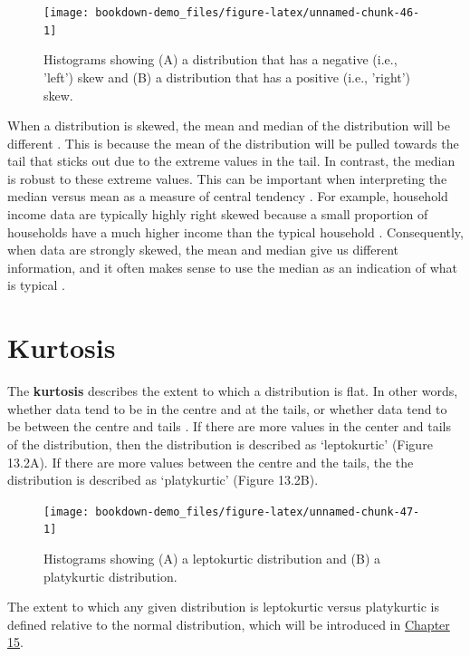 \documentclass[
]{scrbook}
\begin{document}
\begin{figure}
\texttt{[image: bookdown-demo\_files/figure-latex/unnamed-chunk-46-1]} \caption{Histograms showing (A) a distribution that has a negative (i.e., 'left') skew and (B) a distribution that has a positive (i.e., 'right') skew.}\label{fig:unnamed-chunk-46}
\end{figure}

When a distribution is skewed, the mean and median of the distribution will be different \citep{Sokal1995}.
This is because the mean of the distribution will be pulled towards the tail that sticks out due to the extreme values in the tail.
In contrast, the median is robust to these extreme values.
This can be important when interpreting the median versus mean as a measure of central tendency \citep{Reichmann1970}.
For example, household income data are typically highly right skewed because a small proportion of households have a much higher income than the typical household \citep{Mcdonald2013}.
Consequently, when data are strongly skewed, the mean and median give us different information, and it often makes sense to use the median as an indication of what is typical \citep{Chiripanhura2011}.

\hypertarget{kurtosis}{%
\section{Kurtosis}\label{kurtosis}}

The \textbf{kurtosis} describes the extent to which a distribution is flat.
In other words, whether data tend to be in the centre and at the tails, or whether data tend to be between the centre and tails \citep{Sokal1995}.
If there are more values in the center and tails of the distribution, then the distribution is described as `leptokurtic' (Figure 13.2A).
If there are more values between the centre and the tails, the the distribution is described as `platykurtic' (Figure 13.2B).

\begin{figure}
\texttt{[image: bookdown-demo\_files/figure-latex/unnamed-chunk-47-1]} \caption{Histograms showing (A) a leptokurtic distribution and (B) a platykurtic distribution.}\label{fig:unnamed-chunk-47}
\end{figure}

The extent to which any given distribution is leptokurtic versus platykurtic is defined relative to the normal distribution, which will be introduced in \protect\hyperlink{Chapter_15}{Chapter 15}.
\end{document}
